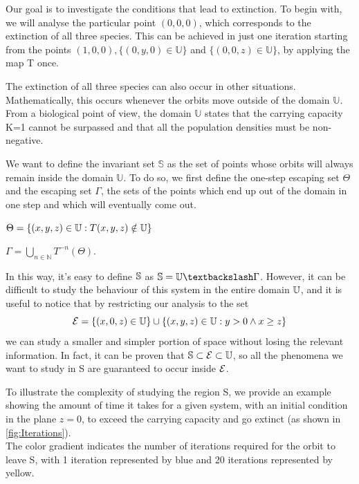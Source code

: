 \documentclass[10pt]{Configuration_Files/PoliMi3i_thesis}
\begin{document}
Our goal is to investigate the conditions that lead to extinction. To begin with, we will analyse the particular point $(0,0,0)$, which corresponds to the extinction of all three species. This can be achieved in just one iteration starting from the points $(1,0,0), \{ (0,y,0) \in \mathbb{U} \}$ and  $\{(0,0,z) \in \mathbb{U} \}$, by applying the map T once.

The extinction of all three species can also occur in other situations. Mathematically, this occurs whenever the orbits move outside of the domain $\mathbb{U}$. 
From a biological point of view, the domain $\mathbb{U}$ states that the carrying capacity K=1 cannot be surpassed and that all the population densities must be non-negative. 


We want to define the invariant set $\mathbb{S}$ as the set of points whose orbits will always remain inside the domain $\mathbb{U}$. To do so, we first define the one-step escaping set $\Theta$ and the escaping set $\Gamma$, the sets of the points which end up out of the domain in one step and which will eventually come out.
\begin{center}
  $\Theta=\{ (x, y, z)\in\U: T(x,y,z)\notin \U\} $
\end{center}
\begin{center}
  $\Gamma = \bigcup\limits_{n\in\mathbb{N}} T^{-n}(\Theta)$.  
\end{center}

In this way, it's easy to define $\S$ as $\S = \U \textbackslash \Gamma$.
However, it can be difficult to study the behaviour of this system in the entire domain $\U$, and it is useful to notice that by restricting our analysis to the set $$\E = \{(x,0,z) \in \mathbb{U}\} \cup \{(x,y,z)\in \mathbb{U}: y > 0 \wedge x \ge z\}$$ we can study a smaller and simpler portion of space without losing the relevant information. In fact, it can be proven that $\S\subset\E\subset\U$, so all the phenomena we want to study in S are guaranteed to occur inside $\E$.

To illustrate the complexity of studying the region S, we provide an example showing the amount of time it takes for a given system, with an initial condition in the plane $z=0$, to exceed the carrying capacity and go extinct (as shown in \autoref{fig:Iterations}).
\\
The color gradient indicates the number of iterations required for the orbit to leave S, with 1 iteration represented by blue and 20 iterations represented by yellow.
\end{document}
